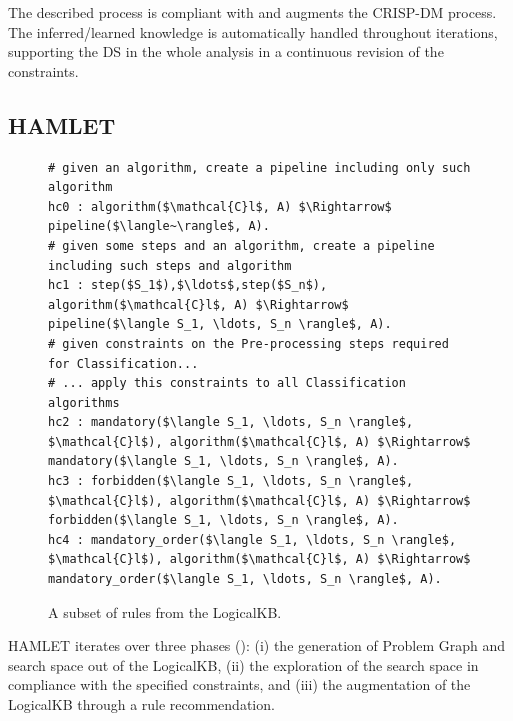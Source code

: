 The described process is compliant with and augments the CRISP-DM process.
The inferred/learned knowledge is automatically handled throughout iterations, supporting the DS in the whole analysis in a continuous revision of the constraints.
\vspace{2cm}

\subsection{HAMLET}\label{ssec:implementation}

\begin{figure}[t]
\begin{lstlisting}[mathescape=true]
# given an algorithm, create a pipeline including only such algorithm
hc0 : algorithm($\mathcal{C}l$, A) $\Rightarrow$ pipeline($\langle~\rangle$, A).
# given some steps and an algorithm, create a pipeline including such steps and algorithm
hc1 : step($S_1$),$\ldots$,step($S_n$), algorithm($\mathcal{C}l$, A) $\Rightarrow$ pipeline($\langle S_1, \ldots, S_n \rangle$, A).
# given constraints on the Pre-processing steps required for Classification...
# ... apply this constraints to all Classification algorithms
hc2 : mandatory($\langle S_1, \ldots, S_n \rangle$, $\mathcal{C}l$), algorithm($\mathcal{C}l$, A) $\Rightarrow$ mandatory($\langle S_1, \ldots, S_n \rangle$, A).
hc3 : forbidden($\langle S_1, \ldots, S_n \rangle$, $\mathcal{C}l$), algorithm($\mathcal{C}l$, A) $\Rightarrow$ forbidden($\langle S_1, \ldots, S_n \rangle$, A).
hc4 : mandatory_order($\langle S_1, \ldots, S_n \rangle$, $\mathcal{C}l$), algorithm($\mathcal{C}l$, A) $\Rightarrow$ mandatory_order($\langle S_1, \ldots, S_n \rangle$, A).
\end{lstlisting}
\caption{A subset of rules from the LogicalKB.}
\label{rules-arg2p}
\end{figure}

HAMLET iterates over three phases (): (i) the generation of Problem Graph and search space out of the LogicalKB, (ii) the exploration of the search space in compliance with the specified constraints, and (iii) the augmentation of the LogicalKB through a rule recommendation.


